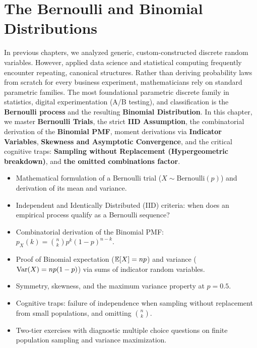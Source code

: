 \chapter{The Bernoulli and Binomial Distributions}

In previous chapters, we analyzed generic, custom-constructed discrete random variables. However, applied data science and statistical computing frequently encounter repeating, canonical structures. Rather than deriving probability laws from scratch for every business experiment, mathematicians rely on standard parametric families. The most foundational parametric discrete family in statistics, digital experimentation (A/B testing), and classification is the \textbf{Bernoulli process} and the resulting \textbf{Binomial Distribution}. In this chapter, we master \textbf{Bernoulli Trials}, the strict \textbf{IID Assumption}, the combinatorial derivation of the \textbf{Binomial PMF}, moment derivations via \textbf{Indicator Variables}, \textbf{Skewness and Asymptotic Convergence}, and the critical cognitive traps: \textbf{Sampling without Replacement (Hypergeometric breakdown)}, and \textbf{the omitted combinations factor}.

\vspace{0.5cm}
\begin{tcolorbox}[colback=primarylight, colframe=primarydark, title={\textbf{What You'll Learn in this Chapter}}]
\begin{itemize}
    \item Mathematical formulation of a Bernoulli trial ($X \sim \text{Bernoulli}(p)$) and derivation of its mean and variance.
    \item Independent and Identically Distributed (IID) criteria: when does an empirical process qualify as a Bernoulli sequence?
    \item Combinatorial derivation of the Binomial PMF: $p_X(k) = \binom{n}{k} p^k (1-p)^{n-k}$.
    \item Proof of Binomial expectation ($\mathbb{E}[X] = np$) and variance ($\operatorname{Var}(X) = np(1-p)$) via sums of indicator random variables.
    \item Symmetry, skewness, and the maximum variance property at $p = 0.5$.
    \item Cognitive traps: failure of independence when sampling without replacement from small populations, and omitting $\binom{n}{k}$.
    \item Two-tier exercises with diagnostic multiple choice questions on finite population sampling and variance maximization.
\end{itemize}
\end{tcolorbox}

